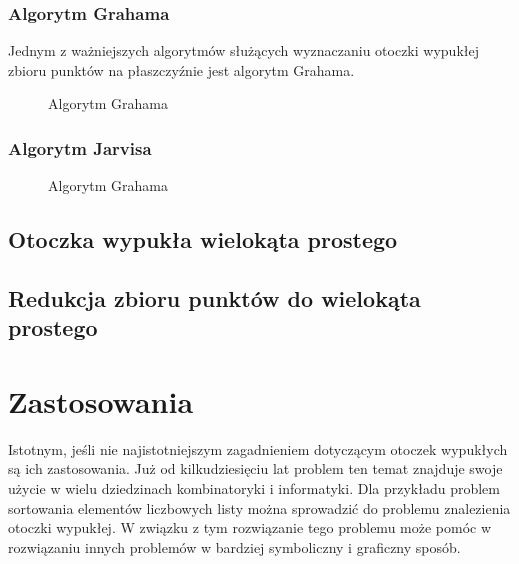               
        \subsection{Algorytm Grahama}
        Jednym z ważniejszych algorytmów służących wyznaczaniu otoczki wypukłej zbioru punktów na płaszczyźnie jest algorytm Grahama.
        \newpage
        \begin{figure}[h!]
        		\begin{center}
    			
    			\caption{Algorytm Grahama}\label{fig:graham}
    			\end{center}
    			\mysource
    	\end{figure}
        \newpage
        \subsection{Algorytm Jarvisa}
        \begin{figure}[h!]
        		\begin{center}
    			
    			\caption{Algorytm Grahama}\label{fig:graham}
    			\end{center}
    			\mysource
    	\end{figure}
        
        
        \section{Otoczka wypukła wielokąta prostego}
        \cite{convexhullsimplepolygon}
        \section{Redukcja zbioru punktów do wielokąta prostego}
    \chapter{Zastosowania} 
    Istotnym, jeśli nie najistotniejszym zagadnieniem dotyczącym otoczek wypukłych są ich zastosowania. Już od kilkudziesięciu lat problem ten temat znajduje swoje użycie w wielu dziedzinach kombinatoryki i informatyki. Dla przykładu problem sortowania elementów liczbowych listy można sprowadzić do problemu znalezienia otoczki wypukłej. W związku z tym rozwiązanie tego problemu może pomóc w rozwiązaniu innych problemów w bardziej symboliczny i graficzny sposób.
